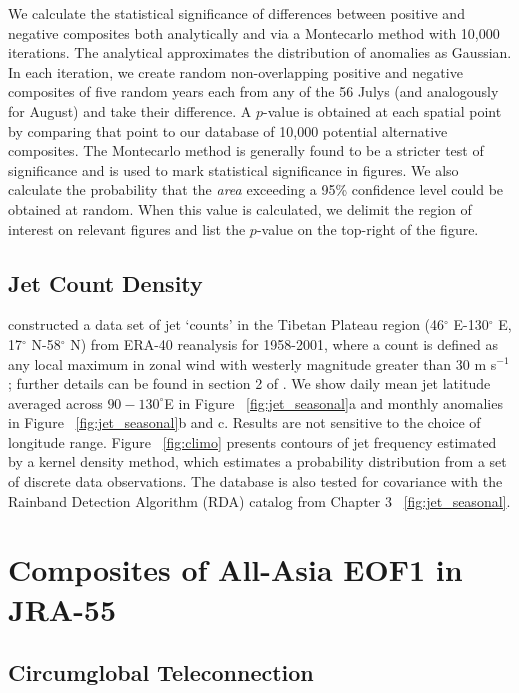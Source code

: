 	We calculate the statistical significance of differences between positive and negative composites both analytically and via a Montecarlo method with 10,000 iterations. The analytical approximates the distribution of anomalies as Gaussian. In each iteration, we create random non-overlapping positive and negative composites of five random years each from any of the 56 Julys (and analogously for August) and take their difference. A $p$-value is obtained at each spatial point by comparing that point to our database of 10,000 potential alternative composites. The Montecarlo method is generally found to be a stricter test of significance and is used to mark statistical significance in figures. We also calculate the probability that the \textit{area} exceeding a 95\% confidence level could be obtained at random. When this value is calculated, we delimit the region of interest on relevant figures and list the $p$-value on the top-right of the figure.

\subsection{Jet Count Density} 

	\citet{Schiemann2009} constructed a data set of jet `counts' in the Tibetan Plateau region (46$^{\circ}$ E-130$^{\circ}$ E, 17$^{\circ}$ N-58$^{\circ}$ N) from ERA-40 reanalysis for 1958-2001, where a count is defined as any local maximum in zonal wind with westerly magnitude greater than $30$ m s$^{-1}$; further details can be found in section 2 of \citet{Schiemann2009}. We show daily mean jet latitude averaged across $90-130^\circ$E in Figure ~\ref{fig:jet_seasonal}a and monthly anomalies in Figure ~\ref{fig:jet_seasonal}b and c. Results are not sensitive to the choice of longitude range. Figure ~\ref{fig:climo} presents contours of jet frequency estimated by a kernel density method, which estimates a probability distribution from a set of discrete data observations. The \citet{Schiemann2009} database is also tested for covariance with the Rainband Detection Algorithm (RDA) catalog from Chapter 3 ~\ref{fig:jet_seasonal}.
	
\section{Composites of All-Asia EOF1 in JRA-55}

\subsection{Circumglobal Teleconnection}

